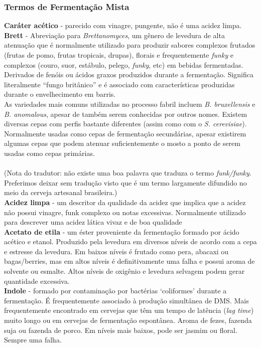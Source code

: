 \subsubsection*{Termos de Fermentação Mista}
\textbf{Caráter acético} - parecido com vinagre, pungente, não é uma acidez limpa.\\
\textbf{Brett} - Abreviação para \textit{Brettanomyces}, um gênero de levedura de alta atenuação que é normalmente utilizado para produzir sabores complexos frutados (frutas de pomo, frutas tropicais, drupas), florais e frequentemente \textit{funky} e complexos (couro, suor, estábulo, pelego, \textit{funky}, etc) em bebidas fermentadas. Derivados de fenóis ou ácidos graxos produzidos durante a fermentação. Significa literalmente “fungo britânico” e é associado com características produzidas durante o envelhecimento em barris.\\
As variedades mais comuns utilizadas no processo fabril incluem \textit{B. bruxellensis} e \textit{B. anomalous}, apesar de também serem conhecidas por outros nomes. Existem diversas cepas com perfis bastante diferentes (assim como com o \textit{S. cerevisiae}).  Normalmente usadas como cepas de fermentação secundárias, apesar existirem algumas cepas que podem atenuar suficientemente o mosto a ponto de serem usadas como cepas primárias.\\\\
(Nota do tradutor: não existe uma boa palavra que traduza o termo \textit{funk/funky}. Preferimos deixar sem tradução visto que é um termo largamente difundido no meio da cerveja artesanal brasileira.)\\
\textbf{Acidez limpa} - um descritor da qualidade da acidez que implica que a acidez não possui vinagre, funk complexo ou notas excessivas. Normalmente utilizado para descrever uma acidez lática vivaz e de boa qualidade\\
\textbf{Acetato de etila} - um éster proveniente da fermentação formado por ácido acético e etanol. Produzido pela levedura em diversos níveis de acordo com a cepa e estresse da levedura. Em baixos níveis é frutado como pera, abacaxi ou bagas/berries, mas em altos níveis é definitivamente uma falha e possui aroma de solvente ou esmalte. Altos níveis de oxigênio e levedura selvagem podem gerar quantidade excessiva.\\
\textbf{Indole} - formado por contaminação por bactérias ‘coliformes’ durante a fermentação. É frequentemente associado à produção simultânea de DMS. Mais frequentemente encontrado em cervejas que têm um tempo de latência (\textit{lag time}) muito longo ou em cervejas de fermentação espontânea. Aroma de fezes, fazenda suja ou fazenda de porco. Em níveis mais baixos, pode ser jasmim ou floral. Sempre uma falha.\\
